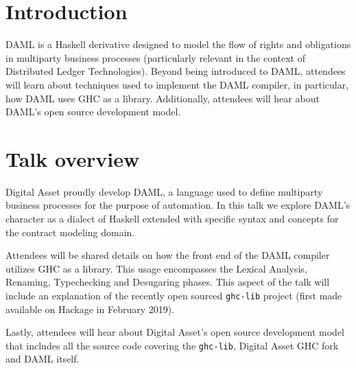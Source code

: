 \documentclass[acmsmall]{acmart}
\begin{document}

%

%
\maketitle

\section{Introduction}
DAML is a Haskell derivative designed to model the flow of rights and obligations in multiparty business processes (particularly relevant in the context of Distributed Ledger Technologies). Beyond being introduced to DAML, attendees will learn about techniques used to implement the DAML compiler, in particular, how DAML uses GHC as a library. Additionally, attendees will hear about DAML's open source development model.

\section{Talk overview}
Digital Asset proudly develop DAML, a language used to define multiparty business processes for the purpose of automation. In this talk we explore DAML's character as a dialect of Haskell extended with specific syntax and concepts for the contract modeling domain.

Attendees will be shared details on how the front end of the DAML compiler utilizes GHC as a library. This usage encompasses the Lexical Analysis, Renaming, Typechecking and Desugaring phases. This aspect of the talk will include an explanation of the recently open sourced \verb|ghc-lib| project (first made available on Hackage in February 2019).

Lastly, attendees will hear about Digital Asset's open source development model that includes all the source code covering the \verb|ghc-lib|, Digital Asset GHC fork and DAML itself.
\end{document}
